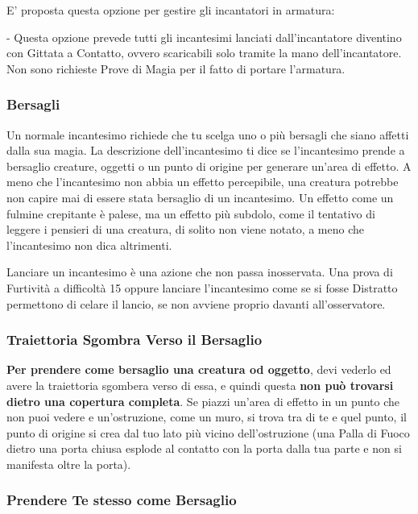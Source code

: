 \begin{multicols}{2}
E' proposta questa opzione per gestire gli incantatori in armatura:

- Questa opzione prevede tutti gli incantesimi lanciati dall'incantatore diventino con Gittata a Contatto, ovvero scaricabili solo tramite la mano dell'incantatore. Non sono richieste Prove di Magia per il fatto di portare l'armatura.


\subsubsection{Bersagli}\label{magiebersagli}

Un normale incantesimo richiede che tu scelga uno o più bersagli che siano affetti dalla sua magia. La descrizione dell'incantesimo ti dice se l'incantesimo prende a bersaglio creature, oggetti o un punto di origine per generare un'area di effetto. A meno che l'incantesimo non abbia un effetto percepibile, una creatura potrebbe non capire mai di essere stata bersaglio di un incantesimo. Un effetto come un fulmine crepitante è palese, ma un effetto più subdolo, come il tentativo di leggere i pensieri di una creatura, di solito non viene notato, a meno che l'incantesimo non dica altrimenti.

Lanciare un incantesimo è una azione che non passa inosservata. Una prova di Furtività a difficoltà 15 oppure lanciare l'incantesimo come se si fosse Distratto permettono di celare il lancio, se non avviene proprio davanti all'osservatore.

\subsubsection*{Traiettoria Sgombra Verso il Bersaglio}

\textbf{Per prendere come bersaglio una creatura od oggetto}, devi vederlo ed avere la traiettoria sgombera verso di essa, e quindi questa \textbf{non può trovarsi dietro una copertura completa}. Se piazzi un'area di effetto in un punto che non puoi vedere e un'ostruzione, come un muro, si trova tra di te e quel punto, il punto di origine si crea dal tuo lato più vicino dell'ostruzione (una Palla di Fuoco dietro una porta chiusa esplode al contatto con la porta dalla tua parte e non si manifesta oltre la porta).

\subsubsection*{Prendere Te stesso come Bersaglio}


\end{multicols}
